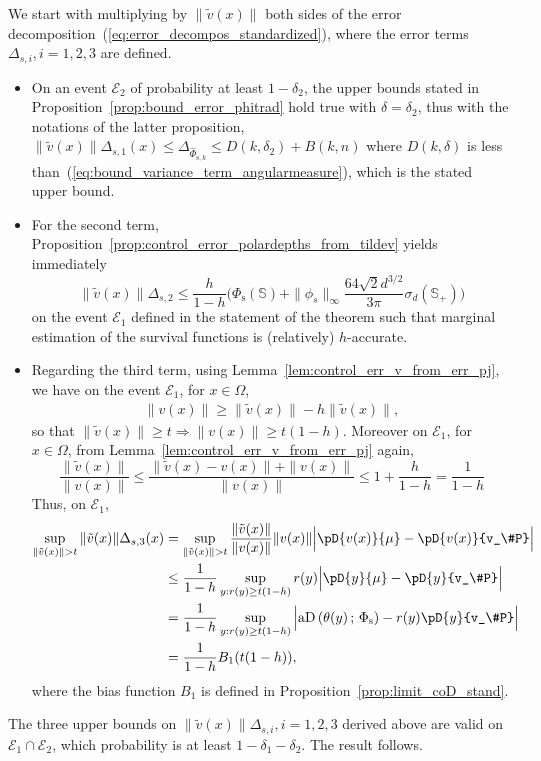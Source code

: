 \documentclass{article}
\numberwithin{equation}{section}
\newcommand{\sphere}{\mathbb{S}}
\newcommand{\coD}[2]{\pD{#1}{#2}}
\newcommand{\mus}{\mu}%
\newcommand{\aD}[2]{{\mathrm{aD}}\left({#1}\,;\,{#2}\right)}
\newcommand{\Phitrad}{\Phi_{\mathrm{s}}} %
\newcommand{\hatPhitrad}{\widehat{\Phi}_{\mathrm{s},k}} %
\begin{document}
 We start with multiplying by $\|\tilde v(x)\|$ both sides of the error decomposition~(\ref{eq:error_decompos_standardized}), where the error terms $\Delta_{s,i}, i = 1,2,3$ are defined.
  \begin{itemize}
  \item  On an event $\mathcal{E}_2$ of probability at least $1-\delta_2$, the upper bounds stated in Proposition~\ref{prop:bound_error_phitrad} hold true with $\delta=\delta_2$, thus with the notations of the latter proposition, $\|\tilde v(x)\| \Delta_{s,1}(x) \le \Delta_{\hatPhitrad} \le D(k,\delta_2) + B(k,n)$ where $D(k,\delta)$ is less than~(\ref{eq:bound_variance_term_angularmeasure}), which is the stated upper bound.
    \item  For the second term, Proposition~\ref{prop:control_error_polardepths_from_tildev} yields immediately
  $$\|\tilde v(x)\|\Delta_{s,2}\le  \frac{h}{1-h} \Big(\Phitrad(\sphere)+ \|\phi_s\|_\infty\frac{64\sqrt{2} d^{3/2}}{3\pi}\sigma_{d}(\sphere_+) \Big) $$ on the event $\mathcal{E}_1$ defined in the statement of the theorem such that marginal estimation of the survival functions is (relatively) $h$-accurate.
  \item  Regarding the third term,  using Lemma~\ref{lem:control_err_v_from_err_pj}, we have on the event $\mathcal{E}_1$,  for $x\in\Omega$, 
  \begin{align*}
    \|v(x)\| \ge \|\tilde v(x) \| -  h \|\tilde v(x)\|, 
  \end{align*}
  so that $\|\tilde v(x)\|\ge t \Rightarrow \|v(x)\|\ge t(1-h)$. Moreover
  on $\mathcal{E}_1$, for $x\in \Omega$, from Lemma~\ref{lem:control_err_v_from_err_pj} again,  
  $$
  \frac{\|\tilde  v(x) \|}{\| v(x) \|}
  \le   \frac{\|\tilde  v(x) - v(x)\| +\|v(x) \|}{\| v(x) \|} \le
  1 + \frac{h}{1-h} = \frac{1}{1-h}
  $$
  Thus, on $\mathcal{E}_1$, 
  \begin{align*}
   \sup_{\| \tilde v(x)\| >t}  \|\tilde v(x)\| \Delta_{s,3}(x)
    &   =  \sup_{\| \tilde v(x)\| >t}  \frac{\|\tilde v(x)\|}{\|v(x)\|}
 \|v(x)\| \Big| \coD{v(x)}{\mus} - \coD{v(x)}{v_\#P}  \Big| 
    \\
    &  \le \frac{1}{1-h}  \sup_{y: r(y) \ge  t(1-h)} r(y)  \Big| \coD{y}{\mus} - \coD{y}{v_\#P}  \Big| \\
    & =
      \frac{1}{1-h}  \sup_{y: r(y) \ge  t(1-h)}  \Big|   \aD{\theta(y)}{\Phitrad} - r(y) \coD{y}{v_\#P}  \Big| \\
    & = \frac{1}{1-h} B_1(t(1-h)), 
  \end{align*}
  where the bias function $B_1$ is defined in Proposition~\ref{prop:limit_coD_stand}. 
  \end{itemize}
   The three upper bounds on $\|\tilde v(x)\| \Delta_{s,i}, i = 1,2,3$ derived above are  valid on $\mathcal{E}_1\cap\mathcal{E}_2$, which probability is at least $1-\delta_1 - \delta_2$. The result follows. 
\end{document}
